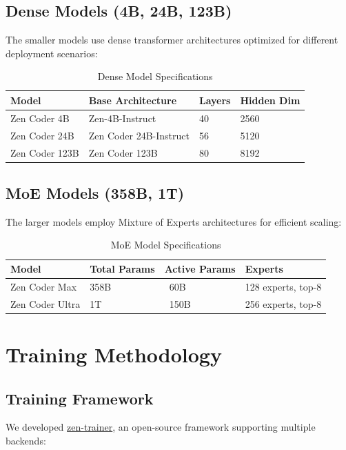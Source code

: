 \documentclass[11pt,a4paper]{article}
\begin{document}
\subsection{Dense Models (4B, 24B, 123B)}

The smaller models use dense transformer architectures optimized for different deployment scenarios:

\begin{table}[H]
\centering
\begin{tabular}{llll}
\toprule
\textbf{Model} & \textbf{Base Architecture} & \textbf{Layers} & \textbf{Hidden Dim} \\
\midrule
Zen Coder 4B & Zen-4B-Instruct & 40 & 2560 \\
Zen Coder 24B & Zen Coder 24B-Instruct & 56 & 5120 \\
Zen Coder 123B & Zen Coder 123B & 80 & 8192 \\
\bottomrule
\end{tabular}
\caption{Dense Model Specifications}
\end{table}

\subsection{MoE Models (358B, 1T)}

The larger models employ Mixture of Experts architectures for efficient scaling:

\begin{table}[H]
\centering
\begin{tabular}{llll}
\toprule
\textbf{Model} & \textbf{Total Params} & \textbf{Active Params} & \textbf{Experts} \\
\midrule
Zen Coder Max & 358B & ~60B & 128 experts, top-8 \\
Zen Coder Ultra & 1T & ~150B & 256 experts, top-8 \\
\bottomrule
\end{tabular}
\caption{MoE Model Specifications}
\end{table}

\section{Training Methodology}

\subsection{Training Framework}

We developed \href{https://github.com/zenlm/zen-trainer}{zen-trainer}, an open-source framework
supporting multiple backends:
\end{document}
